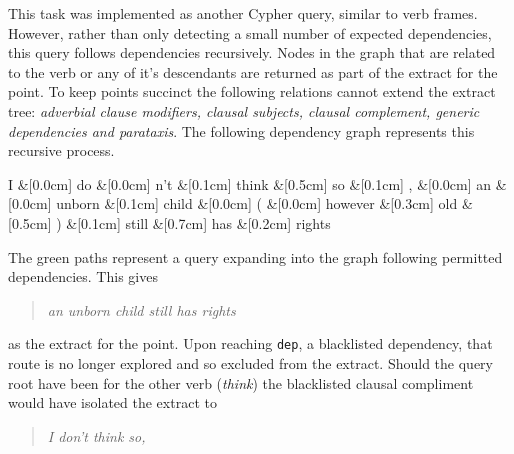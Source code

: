     This task was implemented as another Cypher query, similar to verb frames. However, rather than only detecting a small number of expected dependencies, this query follows dependencies recursively. Nodes in the graph that are related to the verb or any of it's descendants are returned as part of the extract for the point. To keep points succinct the following relations cannot extend the extract tree: \textit{adverbial clause modifiers, clausal subjects, clausal complement, generic dependencies and parataxis}. The following dependency graph represents this recursive process.

    \begin{center}
      \begin{dependency}[edge horizontal padding=0]
        \begin{deptext}
          I \&[0.0cm] do \&[0.0cm] n't \&[0.1cm] think \&[0.5cm] so \&[0.1cm] , \&[0.0cm] an \&[0.0cm] unborn \&[0.1cm] child \&[0.0cm] ( \&[0.0cm] however \&[0.3cm] old \&[0.5cm] ) \&[0.1cm] still \&[0.7cm] has \&[0.2cm] rights \\
        \end{deptext}





      \end{dependency}
    \end{center}

    The green paths represent a query expanding into the graph following permitted dependencies. This gives \blockquote{\textit{an unborn child still has rights}} as the extract for the point. Upon reaching \texttt{dep}, a blacklisted dependency, that route is no longer explored and so excluded from the extract. Should the query root have been for the other verb (\textit{think}) the blacklisted clausal compliment would have isolated the extract to \blockquote{\textit{I don't think so,}}.

